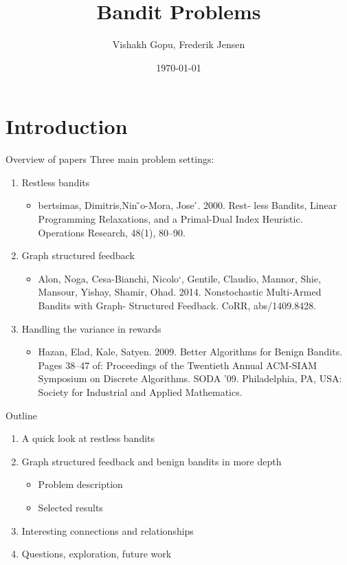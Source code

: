 \documentclass{beamer}
\title{Bandit Problems}
\date{\today}
\author{Vishakh Gopu, Frederik Jensen}
\institute{Advanced machine learning}
\begin{document}
\maketitle


\section{Introduction}
\begin{frame}{Overview of papers}   
  Three main problem settings: 
  \begin{enumerate}
  \item
    Restless bandits
    \begin{itemize}
    \item
      bertsimas, Dimitris,Nin ̃o-Mora, Jose ́. 2000. Rest- less Bandits, Linear Programming
      Relaxations, and a
      Primal-Dual Index Heuristic. Operations Research, 48(1), 80–90.
    \end{itemize}
  \item
    Graph structured feedback
    \begin{itemize}
    \item
      Alon, Noga, Cesa-Bianchi, Nicolo`, Gentile, Claudio, Mannor, Shie, Mansour, Yishay,
      Shamir, Ohad. 2014. Nonstochastic Multi-Armed Bandits with Graph- Structured Feedback.
      CoRR, abs/1409.8428.
    \end{itemize}
  \item
    Handling the variance in rewards
    
    \begin{itemize}
    \item
      Hazan, Elad, Kale, Satyen. 2009. Better Algorithms for Benign Bandits. Pages 38–47 of: 
      Proceedings of the Twentieth Annual ACM-SIAM Symposium on Discrete Algorithms. SODA ’09.
      Philadelphia, PA, USA: Society for Industrial and Applied Mathematics.
    \end{itemize}
  \end{enumerate}
\end{frame}

\begin{frame}{Outline}
  \begin{enumerate}
  \item
    A quick look at restless bandits
    
  \item
    Graph structured feedback and benign bandits in more depth
    \begin{itemize}
    \item
      Problem description
    \item
      Selected results
    \end{itemize}
    
  \item
    Interesting connections and relationships 
  \item
    Questions, exploration, future work
    
  \end{enumerate}
\end{frame}
\end{document}
